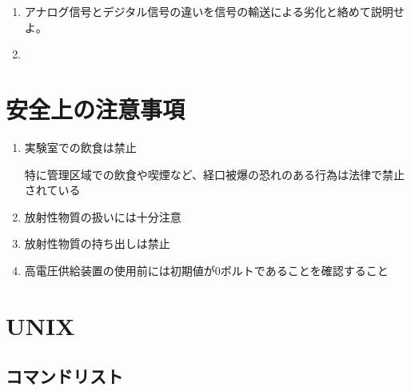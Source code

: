 \documentclass{jarticle}
\begin{document}
 	  \begin{enumerate}
	   \item アナログ信号とデジタル信号の違いを信号の輸送による劣化と絡めて説明せよ。
		 
	   \item 
	  \end{enumerate}
	  
	  
	  
 \section{安全上の注意事項}
 	  \begin{enumerate}
	   \item 実験室での飲食は禁止
		 
		 特に管理区域での飲食や喫煙など、経口被爆の恐れのある行為は法律で禁止されている
		 
	   \item 放射性物質の扱いには十分注意

	   \item 放射性物質の持ち出しは禁止

	   \item 高電圧供給装置の使用前には初期値が0ボルトであることを確認すること
		 
		
	  \end{enumerate}
	  

	  
	  
	  
\clearpage

\appendix 
	  
	  
 \section{UNIX}
	  
  \subsection*{コマンドリスト}
	  
\end{document}
